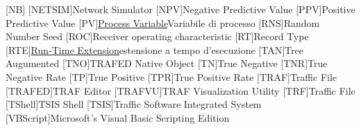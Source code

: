 \begin{acronym}[CTTANBC]
    [NB]{\nb{}}
    [NETSIM]{Network Simulator}
    [NPV]{Negative Predictive Value}
    [PPV]{Positive Predictive Value}
    [PV]{\ul{Process Variable}{Variabile di processo}}
    [RNS]{Random Number Seed}
    [ROC]{Receiver operating characteristic}
    [RT]{Record Type}
    [RTE]{\ul{Run-Time Extension}{estensione a tempo d'esecuzione}}
    [TAN]{Tree Augumented \nb{}}
    [TNO]{TRAFED Native Object}
    [TN]{True Negative}
    [TNR]{True Negative Rate}
    [TP]{True Positive}
    [TPR]{True Positive Rate}
    [TRAF]{Traffic File}
    [TRAFED]{TRAF Editor}
    [TRAFVU]{TRAF Visualization Utility}
    [TRF]{Traffic File}
    [TShell]{TSIS Shell}
    [TSIS]{Traffic Software Integrated System}
    [VBScript]{Microsoft's Visual Basic Scripting Edition}
\end{acronym}
\normalsize
